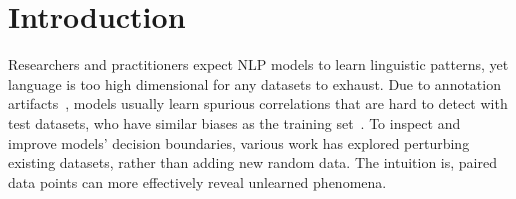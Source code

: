 \section{Introduction}
\label{sec:intro}

Researchers and practitioners expect NLP models to learn linguistic patterns, yet language is too high dimensional for any datasets to exhaust.
Due to annotation artifacts~\cite{}, models usually learn spurious correlations that are hard to detect with test datasets, who have similar biases as the training set~\cite{rajpurkar-etal-2018-know}.
To inspect and improve models' decision boundaries, various work has explored perturbing existing datasets, rather than adding new random data.
The intuition is, paired data points can more effectively reveal unlearned phenomena. 


